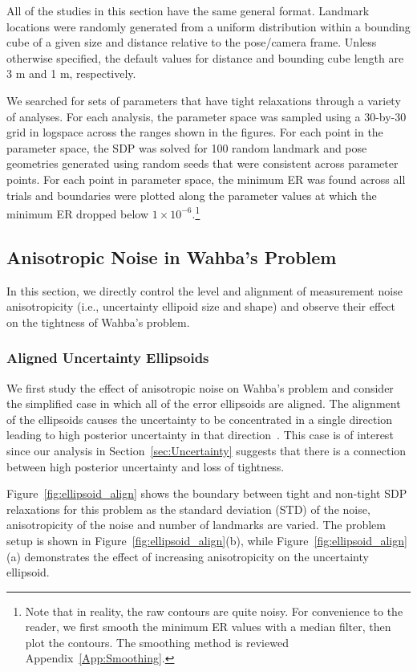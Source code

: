 \documentclass[lettersize,journal]{IEEEtran}
\begin{document}
All of the studies in this section have the same general format. Landmark locations were randomly generated from a uniform distribution within a bounding cube of a given size and distance relative to the pose/camera frame. Unless otherwise specified, the default values for distance and bounding cube length are 3 m and 1 m, respectively. 

We searched for sets of parameters that have tight relaxations through a variety of analyses. For each analysis, the parameter space was sampled using a 30-by-30 grid in logspace across the ranges shown in the figures. For each point in the parameter space, the SDP was solved for 100 random landmark and pose geometries generated using random seeds that were consistent across parameter points. For each point in parameter space, the minimum ER was found across all trials and boundaries were plotted along the parameter values at which the minimum ER dropped below $1\times10^{-6}$.\footnote{Note that in reality, the raw contours are quite noisy. For convenience to the reader, we first smooth the minimum ER values with a median filter, then plot the contours. The smoothing method is reviewed Appendix~\ref{App:Smoothing}.}

\subsection{Anisotropic Noise in Wahba's Problem}\label{sec:NoiseAnalysis}

In this section, we directly control the level and alignment of measurement noise anisotropicity (i.e., uncertainty ellipoid size and shape) and observe their effect on the tightness of Wahba's problem. 

\subsubsection{Aligned Uncertainty Ellipsoids}

We first study the effect of anisotropic noise  on Wahba's problem and consider the simplified case in which all of the error ellipsoids are aligned. The alignment of the ellipsoids causes the uncertainty to be concentrated in a single direction leading to high posterior uncertainty in that direction~\cite{zhangDegeneracyOptimizationbasedState2016}. This case is of interest since our analysis in Section~\ref{sec:Uncertainty} suggests that there is a connection between high posterior uncertainty and loss of tightness. 

Figure~\ref{fig:ellipsoid_align} shows the boundary between tight and non-tight SDP relaxations for this problem as the standard deviation (STD) of the noise, anisotropicity of the noise  and number of landmarks are varied. The problem setup is shown in Figure~\ref{fig:ellipsoid_align}(b), while Figure~\ref{fig:ellipsoid_align}(a) demonstrates the effect of increasing anisotropicity on the uncertainty ellipsoid.
\end{document}
